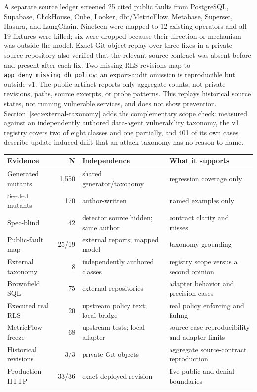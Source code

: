 A separate source ledger screened 25 cited public faults from PostgreSQL, Supabase, ClickHouse, Cube, Looker, dbt/MetricFlow, Metabase, Superset, Hasura, and LangChain. Nineteen were mapped to 12 existing operators and all 19 fixtures were killed; six were dropped because their direction or mechanism was outside the model. Exact Git-object replay over three fixes in a private source repository also verified that the relevant source contract was absent before and present after each fix. Two missing-RLS revisions map to \texttt{app\_deny\_missing\_db\_policy}; an export-audit omission is reproducible but outside v1. The public artifact reports only aggregate counts, not private revisions, paths, source excerpts, or probe patterns. This replays historical source states, not running vulnerable services, and does not show prevention. Section~\ref{sec:external-taxonomy} adds the complementary scope check: measured against an independently authored data-agent vulnerability taxonomy, the v1 registry covers two of eight classes and one partially, and 401 of its own cases describe update-induced drift that an attack taxonomy has no reason to name.

\begin{center}
\scriptsize
\setlength{\tabcolsep}{2pt}
\begin{tabular}{@{}L{0.25\columnwidth}rL{0.28\columnwidth}L{0.31\columnwidth}@{}}
\toprule
Evidence & N & Independence & What it supports \\
\midrule
Generated mutants & 1,550 & shared generator/taxonomy & regression coverage only \\
Seeded mutants & 170 & author-written & named examples only \\
Spec-blind & 42 & detector source hidden; same author & contract clarity and misses \\
Public-fault map & 25/19 & external reports; mapped model & taxonomy grounding \\
External taxonomy & 8 & independently authored classes & registry scope versus a second opinion \\
Brownfield SQL & 75 & external repositories & adapter behavior and precision cases \\
Executed real RLS & 20 & upstream policy text; local bridge & real policy enforcing and failing \\
MetricFlow freeze & 68 & upstream tests; local adapter & source-case reproducibility and adapter limits \\
Historical revisions & 3/3 & private Git objects & aggregate source-contract reproduction \\
Production HTTP & 33/36 & exact deployed revision & live public and denial boundaries \\
\bottomrule
\end{tabular}
\end{center}

